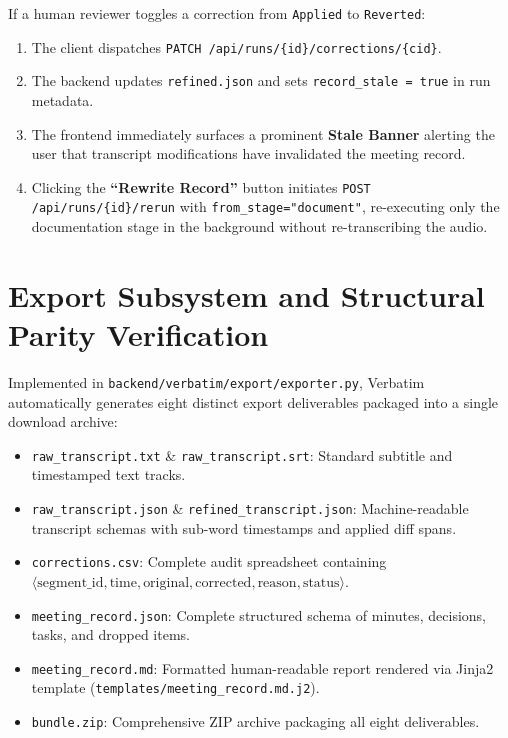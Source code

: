 \documentclass[10pt,a4paper]{article}
\begin{document}
If a human reviewer toggles a correction from \texttt{Applied} to \texttt{Reverted}:
\begin{enumerate}
    \item The client dispatches \texttt{PATCH /api/runs/\{id\}/corrections/\{cid\}}.
    \item The backend updates \texttt{refined.json} and sets \texttt{record\_stale = true} in run metadata.
    \item The frontend immediately surfaces a prominent \textbf{Stale Banner} alerting the user that transcript modifications have invalidated the meeting record.
    \item Clicking the \textbf{``Rewrite Record''} button initiates \texttt{POST /api/runs/\{id\}/rerun} with \texttt{from\_stage="document"}, re-executing only the documentation stage in the background without re-transcribing the audio.
\end{enumerate}

\section{Export Subsystem and Structural Parity Verification}
\label{sec:export}

Implemented in \texttt{backend/verbatim/export/exporter.py}, Verbatim automatically generates eight distinct export deliverables packaged into a single download archive:
\begin{itemize}
    \item \texttt{raw\_transcript.txt} \& \texttt{raw\_transcript.srt}: Standard subtitle and timestamped text tracks.
    \item \texttt{raw\_transcript.json} \& \texttt{refined\_transcript.json}: Machine-readable transcript schemas with sub-word timestamps and applied diff spans.
    \item \texttt{corrections.csv}: Complete audit spreadsheet containing $\langle \text{segment\_id}, \text{time}, \text{original}, \text{corrected}, \text{reason}, \text{status} \rangle$.
    \item \texttt{meeting\_record.json}: Complete structured schema of minutes, decisions, tasks, and dropped items.
    \item \texttt{meeting\_record.md}: Formatted human-readable report rendered via Jinja2 template (\texttt{templates/meeting\_record.md.j2}).
    \item \texttt{bundle.zip}: Comprehensive ZIP archive packaging all eight deliverables.
\end{itemize}
\end{document}
